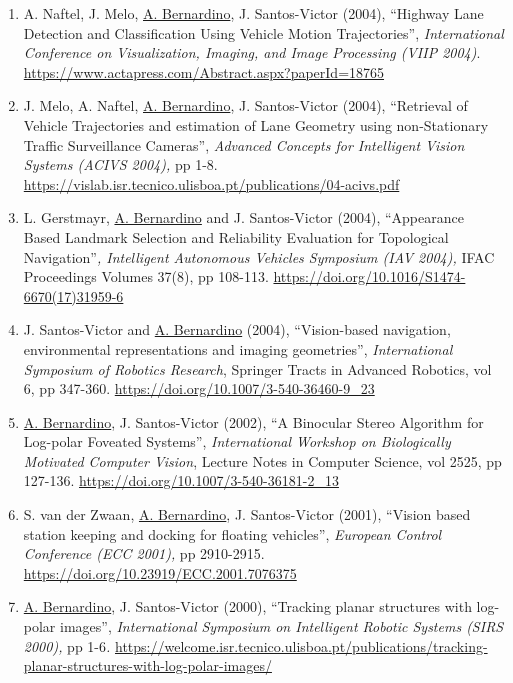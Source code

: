 \documentclass[
]{article}
\begin{document}
\begin{enumerate}
  \emph{International Conference on Image Analysis and Recognition
  (ICIAR)}, Lecture Notes in Computer Science, Springer, vol 3212, pp
  454--462. \url{https://doi.org/10.1007/978-3-540-30126-4_56}~
\item
  A. Naftel, J. Melo, \ul{A. Bernardino}, J. Santos-Victor (2004),
  ``Highway Lane Detection and Classification Using Vehicle Motion
  Trajectories'', \emph{International Conference on Visualization,
  Imaging, and Image Processing (VIIP 2004)}.
  \url{https://www.actapress.com/Abstract.aspx?paperId=18765}
\item
  J. Melo, A. Naftel, \ul{A. Bernardino}, J. Santos-Victor (2004),
  ``Retrieval of Vehicle Trajectories and estimation of Lane Geometry
  using non-Stationary Traffic Surveillance Cameras'', \emph{Advanced
  Concepts for Intelligent Vision Systems (ACIVS 2004),} pp 1-8.
  \url{https://vislab.isr.tecnico.ulisboa.pt/publications/04-acivs.pdf}~
\item
  L. Gerstmayr, \ul{A. Bernardino} and J. Santos-Victor (2004),
  ``Appearance Based Landmark Selection and Reliability Evaluation for
  Topological Navigation''\emph{, Intelligent Autonomous Vehicles
  Symposium (IAV 2004),} IFAC Proceedings Volumes 37(8), pp 108-113.
  \url{https://doi.org/10.1016/S1474-6670(17)31959-6}~
\item
  J. Santos-Victor and \ul{A. Bernardino} (2004), ``Vision-based
  navigation, environmental representations and imaging geometries'',
  \emph{International Symposium of Robotics Research}, Springer Tracts
  in Advanced Robotics, vol 6, pp 347-360.
  \url{https://doi.org/10.1007/3-540-36460-9_23}~
\item
  \ul{A. Bernardino}, J. Santos-Victor (2002), ``A Binocular Stereo
  Algorithm for Log-polar Foveated Systems'', \emph{International
  Workshop on Biologically Motivated Computer Vision}, Lecture Notes in
  Computer Science, vol 2525, pp 127-136.
  \url{https://doi.org/10.1007/3-540-36181-2_13}~
\item
  S. van der Zwaan, \ul{A. Bernardino}, J. Santos-Victor (2001),
  ``Vision based station keeping and docking for floating vehicles'',
  \emph{European Control Conference (ECC 2001),} pp 2910-2915.
  \url{https://doi.org/10.23919/ECC.2001.7076375}~
\item
  \ul{A. Bernardino}, J. Santos-Victor (2000), ``Tracking planar
  structures with log-polar images'', \emph{International Symposium on
  Intelligent Robotic Systems (SIRS 2000),} pp 1-6\emph{.}
  \url{https://welcome.isr.tecnico.ulisboa.pt/publications/tracking-planar-structures-with-log-polar-images/}~

\end{enumerate}
\end{document}
